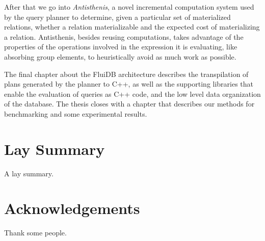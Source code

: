 \begin{precontent}
After that we go into \emph{Antisthenis}, a novel incremental computation
system used by the query planner to determine, given a particular set
of materialized relations, whether a relation materializable and the
expected cost of materializing a relation. Antisthenis, besides
reusing computations, takes advantage of the properties of the
operations involved in the expression it is evaluating, like absorbing
group elements, to heuristically avoid as much work as possible.

The final chapter about the FluiDB architecture describes the
transpilation of plans generated by the planner to C++, as well as the
supporting libraries that enable the evaluation of queries as C++
code, and the low level data organization of the database. The thesis
closes with a chapter that describes our methods for benchmarking and
some experimental results.


\chapter{Lay Summary}%
A lay summary.

\chapter{Acknowledgements}%
Thank some people.





\end{precontent}


\tableofcontents

\cleardoublepage
{}
{}
\listoffigures

\cleardoublepage%
